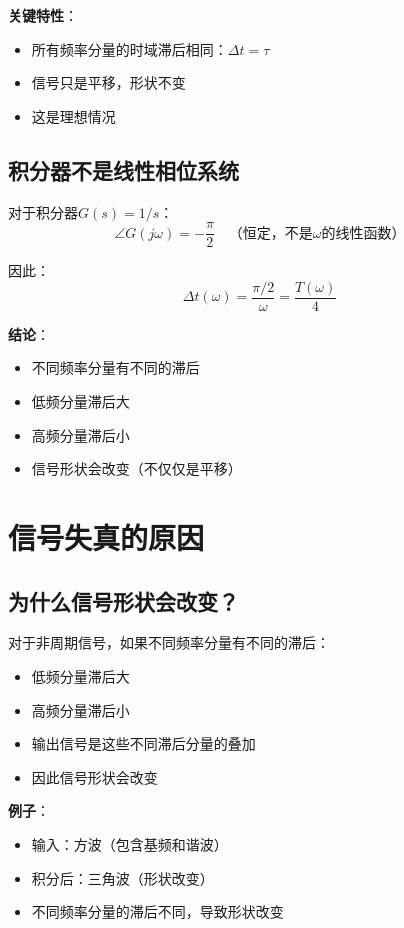 \documentclass[12pt,a4paper]{article}
\begin{document}
\textbf{关键特性}：
\begin{itemize}
\item 所有频率分量的时域滞后相同：$\Delta t = \tau$
\item 信号只是平移，形状不变
\item 这是理想情况
\end{itemize}

\subsection{积分器不是线性相位系统}

对于积分器$G(s) = 1/s$：
\begin{equation}
\angle G(j\omega) = -\frac{\pi}{2} \quad \text{（恒定，不是$\omega$的线性函数）}
\end{equation}

因此：
\begin{equation}
\Delta t(\omega) = \frac{\pi/2}{\omega} = \frac{T(\omega)}{4}
\end{equation}

\textbf{结论}：
\begin{itemize}
\item 不同频率分量有不同的滞后
\item 低频分量滞后大
\item 高频分量滞后小
\item 信号形状会改变（不仅仅是平移）
\end{itemize}

\section{信号失真的原因}

\subsection{为什么信号形状会改变？}

对于非周期信号，如果不同频率分量有不同的滞后：
\begin{itemize}
\item 低频分量滞后大
\item 高频分量滞后小
\item 输出信号是这些不同滞后分量的叠加
\item 因此信号形状会改变
\end{itemize}

\textbf{例子}：
\begin{itemize}
\item 输入：方波（包含基频和谐波）
\item 积分后：三角波（形状改变）
\item 不同频率分量的滞后不同，导致形状改变
\end{itemize}
\end{document}
